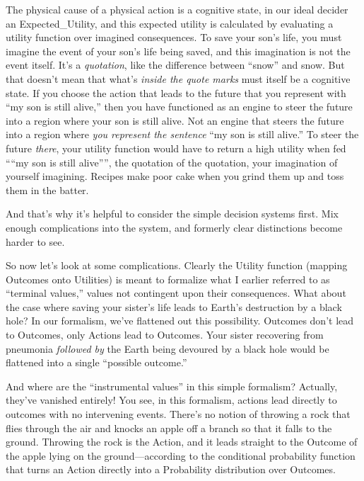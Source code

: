{
 The physical cause of a physical action is a cognitive state, in
our ideal decider an Expected\_Utility, and this expected utility is
calculated by evaluating a utility function over imagined consequences.
To save your son's life, you must imagine the event of
your son's life being saved, and this imagination is
not the event itself. It's a \textit{quotation}, like
the difference between ``snow'' and
snow. But that doesn't mean that what's
\textit{inside the quote marks} must itself be a cognitive state. If
you choose the action that leads to the future that you represent with
``my son is still alive,'' then you
have functioned as an engine to steer the future into a region where
your son is still alive. Not an engine that steers the future into a
region where \textit{you represent the sentence} ``my
son is still alive.'' To steer the future
\textit{there}, your utility function would have to return a high
utility when fed ````my son is still
alive'''', the quotation of the
quotation, your imagination of yourself imagining. Recipes make poor
cake when you grind them up and toss them in the batter.}

{
 And that's why it's helpful to
consider the simple decision systems first. Mix enough complications
into the system, and formerly clear distinctions become harder to see.}

{
 So now let's look at some complications. Clearly
the Utility function (mapping Outcomes onto Utilities) is meant to
formalize what I earlier referred to as ``terminal
values,'' values not contingent upon their
consequences. What about the case where saving your
sister's life leads to Earth's
destruction by a black hole? In our formalism, we've
flattened out this possibility. Outcomes don't lead to
Outcomes, only Actions lead to Outcomes. Your sister recovering from
pneumonia \textit{followed by} the Earth being devoured by a black hole
would be flattened into a single ``possible
outcome.''}

{
 And where are the ``instrumental
values'' in this simple formalism? Actually,
they've vanished entirely! You see, in this formalism,
actions lead directly to outcomes with no intervening events.
There's no notion of throwing a rock that flies through
the air and knocks an apple off a branch so that it falls to the
ground. Throwing the rock is the Action, and it leads straight to the
Outcome of the apple lying on the ground---according to the conditional
probability function that turns an Action directly into a Probability
distribution over Outcomes.}

